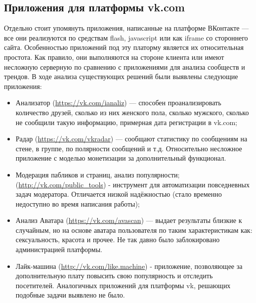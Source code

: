 \begin{itemize}
\begin{itemize}
%
\end{itemize}
\subsection{Приложения для платформы vk.com}
Отдельно стоит упомянуть приложения, написанные на платформе ВКонтакте — все они реализуются по средствам flash, javascript или как iframe со стороннего сайта. Особенностью приложений под эту платорму является их относительная простота. Как правило, они выполняются на стороне клиента или имеют несложную серверную по сравнению с приложениями для анализа сообществ и трендов. В ходе анализа существующих решений были выявлены следующие приложения:
\begin{itemize}
\item Анализатор (\url {https://vk.com/ianaliz}) — способен проанализировать количество друзей, сколько из них женского пола, сколько мужского, сколько не сообщили такую информацию, примерная дата регистрации в vk.com;
\item Радар (\url{https://vk.com/vkradar}) — сообщают статистику по сообщениям на стене, в группе, по полярности сообщений и т.д. Относительно несложное приложение с моделью монетизации за дополнительный функционал.
\item Модерация пабликов и страниц, анализ популярности; (\url{http://vk.com/public_tools}) - инструмент для автоматизации повседневных задач модератора. Отличается низкой надёжностью (стало временно недоступно во время написания работы);
\item Анализ Аватара (\url{https://vk.com/avascan}) — выдает результаты близкие к случайным, но на основе аватара пользователя по таким характеристикам как: сексуальность, красота и прочее. Не так давно было заблокировано администрацией платформы.
\item Лайк-машина (\url{http://vk.com/like.machine}) - приложение, позволяющее за дополнительную плату повысить свою популярность и отследить посетителей.
Аналогичных приложений для платформы vk, решающих подобные задачи выявлено не было.
\end{itemize}


\end{itemize}
